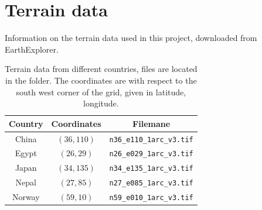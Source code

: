 \appendix
\section{Terrain data}\label{ap:terrain_data}
Information on the terrain data used in this project, downloaded from EarthExplorer.
\begin{table}[h]
    \centering
    \begin{tabular}{ccc}
        \hline
        Country & Coordinates & Filemane \\
        \hline
        China & $(36, 110)$ & \verb|n36_e110_1arc_v3.tif| \\
        Egypt & $(26, 29)$ & \verb|n26_e029_1arc_v3.tif| \\
        Japan & $(34, 135)$ & \verb|n34_e135_1arc_v3.tif| \\
        Nepal & $(27, 85)$ & \verb|n27_e085_1arc_v3.tif| \\
        Norway & $(59, 10)$ & \verb|n59_e010_1arc_v3.tif| \\
        \hline
    \end{tabular}
    \caption{Terrain data from different countries, files are located in the folder. The coordinates are with respect to the south west corner of the grid, given in latitude, longitude.}
    \label{tab:terrain_data}
\end{table}


